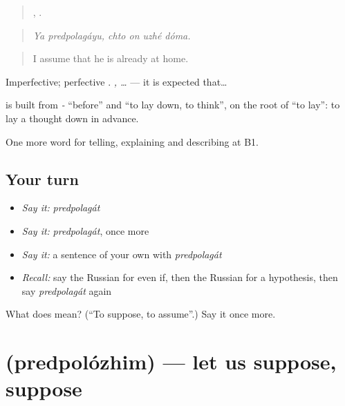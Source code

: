 \begin{quote}
 ,    .
\end{quote}

\begin{quote}
\emph{Ya predpolagáyu, chto on uzhé dóma.}
\end{quote}

\begin{quote}
I assume that he is already at home.
\end{quote}

Imperfective; perfective \emph{}. \emph{, …} — it is expected that…

\begin{cousinweb}
\textbf{} is built from \emph{-} \textquotedblleft{}before\textquotedblright{} and \emph{} \textquotedblleft{}to lay down, to think\textquotedblright{}, on the root of \emph{} \textquotedblleft{}to lay\textquotedblright{}: to lay a thought down in advance.
\end{cousinweb}

\begin{grammarlens}[title={What you've built}]
One more word for telling, explaining and describing at B1.
\end{grammarlens}

\subsection*{Your turn}
\begin{itemize}
\raggedright
  \item \emph{Say it:} \emph{predpolagát}
  \item \emph{Say it:} \emph{predpolagát}, once more
  \item \emph{Say it:} a sentence of your own with \emph{predpolagát}
  \item \emph{Recall:} say the Russian for even if, then the Russian for a hypothesis, then say \emph{predpolagát} again
\end{itemize}

\begin{tcolorbox}[breakable,colback=teal!4,colframe=teal!35!black,title={Before you move on}]
What does  mean? (\textquotedblleft{}To suppose, to assume\textquotedblright{}.) Say it once more.
\end{tcolorbox}
\section[\texorpdfstring{\ru{предположим} (predpolózhim)}{предположим (predpolózhim)}]{ (predpolózhim) — let us suppose, suppose}

